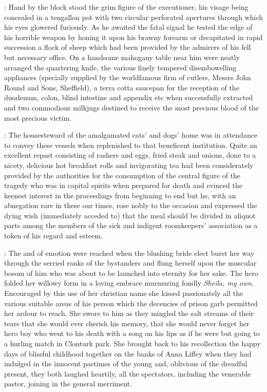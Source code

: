 :
Hand by the block stood
the grim figure of the executioner, his visage being concealed in a
tengallon pot with two circular perforated apertures through which
his eyes glowered furiously. As he awaited the fatal signal he
tested the edge of his horrible weapon by honing it upon his
brawny forearm or decapitated in rapid succession a flock of
sheep which had been provided by the admirers of his fell but necessary
office. On a handsome mahogany table near him were neatly arranged the
quartering knife, the various finely tempered disembowelling appliances
(specially supplied by the worldfamous firm of cutlers, Messrs John Round
and Sons, Sheffield), a terra cotta saucepan for the reception of the
duodenum, colon, blind intestine and appendix etc when successfully
extracted and two commodious milkjugs destined to receive the most
precious blood of the most precious victim.

:
The housesteward of the
amalgamated cats' and dogs' home was in attendance to convey these
vessels when replenished to that beneficent institution. Quite an
excellent repast consisting of rashers and eggs, fried steak and onions,
done to a nicety, delicious hot breakfast rolls and invigorating tea had
been considerately provided by the authorities for the consumption
of the central figure of the tragedy who was in capital spirits
when prepared for death and evinced the keenest interest in the
proceedings from beginning to end but he, with an abnegation rare
in these our times, rose nobly to the occasion and expressed the
dying wish (immediately acceded to) that the meal should be
divided in aliquot parts among the members of the sick and indigent
roomkeepers' association as a token of his regard and esteem.

:
The  and 
of emotion were reached when the blushing bride elect burst
her way through the serried ranks of the bystanders and flung herself upon
the muscular bosom of him who was about to be launched into eternity for
her sake. The hero folded her willowy form in a loving embrace murmuring
fondly \emph{Sheila, my own}. Encouraged by this use of her christian name she
kissed passionately all the various suitable areas of his person which the
decencies of prison garb permitted her ardour to reach. She swore to him
as they mingled the salt streams of their tears that she would ever
cherish his memory, that she would never forget her hero boy who went to
his death with a song on his lips as if he were but going to a hurling
match in Clonturk park. She brought back to his recollection the happy
days of blissful childhood together on the banks of Anna Liffey when they
had indulged in the innocent pastimes of the young and, oblivious of the
dreadful present, they both laughed heartily, all the spectators,
including the venerable pastor, joining in the general merriment.

